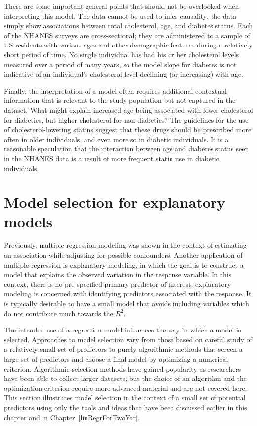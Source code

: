 There are some important general points that should not be overlooked when interpreting this model. The data cannot be used to infer causality; the data simply show associations between total cholesterol, age, and diabetes status. Each of the NHANES surveys are cross-sectional; they are administered to a sample of US residents with various ages and other demographic features during a relatively short period of time.  No single individual has had his or her cholesterol levels measured over a period of many years, so the model slope for diabetes is not indicative of an individual's cholesterol level declining (or increasing) with age.

Finally, the interpretation of a model often requires additional contextual information that is relevant to the study population but not captured in the dataset. What might explain increased age being associated with lower cholesterol for diabetics, but higher cholesterol for non-diabetics? The guidelines for the use of cholesterol-lowering statins suggest that these drugs should be prescribed more often in older individuals, and even more so in diabetic individuals. It is a reasonable speculation that the interaction between age and diabetes status seen in the NHANES data is a result of more frequent statin use in diabetic individuals.



\section{Model selection for explanatory models}
\label{modelSelection}



Previously, multiple regression modeling was shown in the context of estimating an association while adjusting for possible confounders. Another application of multiple regression is explanatory modeling, in which the goal is to construct a model that explains the observed variation in the response variable. In this context, there is no pre-specified primary predictor of interest; explanatory modeling is concerned with identifying predictors associated with the response. It is typically desirable to have a small model that avoids including variables which do not contribute much towards the $R^2$.

The intended use of a regression model influences the way in which a model is selected. Approaches to model selection vary from those based on careful study of a relatively small set of predictors to purely algorithmic methods that screen a large set of predictors and choose a final model by optimizing a numerical criterion. Algorithmic selection methods have gained popularity as researchers have been able to collect larger datasets, but the choice of an algorithm and the optimization criterion require more advanced material and are not covered here. This section illustrates model selection in the context of a small set of potential predictors using only the tools and ideas that have been discussed earlier in this chapter and in Chapter~\ref{linRegrForTwoVar}. 

